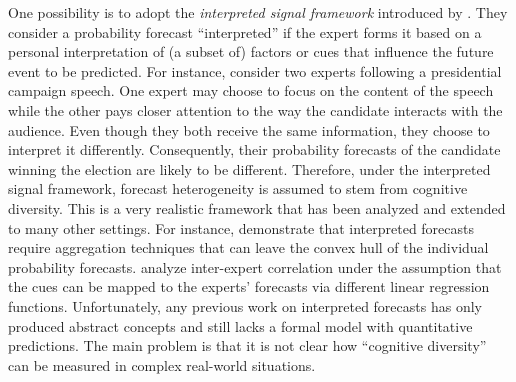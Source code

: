 \documentclass[11pt]{article}
\theoremstyle{definition}
\theoremstyle{definition}
\begin{document}
One possibility is to adopt the \textit{interpreted signal framework} introduced by \citet{hong2009interpreted}. They consider a probability forecast ``interpreted'' if the expert forms it based on a personal interpretation of (a subset of) factors or cues that influence the future event to be predicted. For instance, consider two experts following a presidential campaign speech. One expert may choose to focus on the content of the speech while the other pays closer attention to the way the candidate interacts with the audience.  Even though they both receive the same information, they choose to interpret it differently. Consequently, their probability forecasts of the candidate winning the election are likely to be different. Therefore, under the interpreted signal framework, forecast heterogeneity is assumed to stem from cognitive diversity. This is a very realistic framework that has been analyzed and extended to many other settings. For instance, \citet{parunak2013characterizing} demonstrate that interpreted forecasts require aggregation techniques that can leave the convex hull of the individual probability forecasts. \citet{broomell2009experts} analyze inter-expert correlation under the assumption that the cues can be mapped to the experts' forecasts via different linear regression functions. Unfortunately, any previous work on interpreted forecasts has only produced abstract concepts and still lacks a formal model with quantitative predictions. The main problem is that it is not clear how ``cognitive diversity'' can be measured in complex real-world situations.
 
\end{document}
